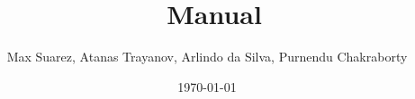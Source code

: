 \documentclass[11pt,oneside]{book}
\title{\ggn\ Manual}
\author{Max Suarez, Atanas Trayanov, Arlindo da Silva, Purnendu Chakraborty}
\date{\today}
\begin{document}
\maketitle
\dominitoc
\tableofcontents
\end{document}
